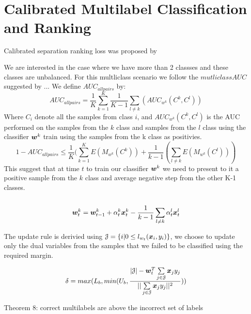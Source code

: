 \section{Calibrated Multilabel Classification and Ranking}

Calibrated separation ranking loss was proposed by \cite{GuoShuurmans11}

We are interested in the case where we have more than 2 classses and these classes are unbalanced. For this multliclass scenario we follow the $mutliclass AUC$ suggested by ... 
We define $AUC_{all pairs}$ by:
\[
	AUC_{all pairs} = \frac{1}{K} \sum\limits_{k=1}^{K}  \frac{1}{K-1}\sum\limits_{l \neq k} (AUC_{w^k}(C^k, C^l)) 
\]
Where $C_i$ denote all the samples from class $i$, and $AUC_{w^k}(C^k, C^l)$ is the AUC performed on the samples from the $k$ class and samples from the $l$ class using the classifier $ \bm{w}^k $ train using the samples from the k class as positivies.
\[
1 - AUC_{all pairs} \leq \frac{1}{K} ( \sum\limits_{k=1}^{K} E(M_{w^k}(C^k)) + \frac{1}{k-1} ( \sum\limits_{l \neq k}  E(M_{w^k}(C^l)) )
\]
This suggest that at time $t$ to train our classifier $\bm{w}^k $ we need to present to it a positive sample from the $k$ class and average negative step from the other K-1 classes.\\
\\
\[
  \bm{w}^k_t = \bm{w}^k_{t-1} + \alpha^k_t \bm{x}^k_t - \frac{1}{k-1}\sum\limits_{l \neq k} \alpha^l_t \bm{x}^l_t
\]


The update rule is derivied using $\mathcal{J} = \{ i | 0 \leq l_{w_t}(\bm{x}_i, y_i) \}$, we choose to update only the dual variables from the samples that we failed to be classified using the required margin.

\[ \delta = max(L_b   , min(U_b , \frac{|\mathcal{J}| - \bm{w}_t^T \sum\limits_{j \in \mathcal{J}} {\bm{x}_j y_j}   }{|| \sum\limits_{j \in \mathcal{J} }{\bm{x}_j y_j} ||^2 }  ) )
\]

Theorem 8: correct multilabels are above the incorrect set of labels
